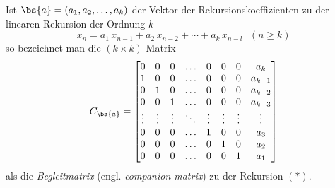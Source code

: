 
Ist $\bs{a} = (a_1,a_2,\ldots,a_k)$ der Vektor der Rekursionskoeffizienten zu
der linearen Rekursion der Ordnung $k$
\begin{equation*}
x_{n} = a_1 \, x_{n-1} + a_2 \, x_{n-2} + \cdots + a_k \, x_{n-l}~~~(n \geq k)
\tag{$*$}
\end{equation*}
so bezeichnet man die $(k \times k)$-Matrix
\[
C_{\bs{a}} = \begin{bmatrix}
0 & 0 & 0 &    \ldots & 0& 0& 0  & a_k \cr
1 & 0 & 0 &    \ldots & 0& 0& 0  & a_{k-1} \cr
0 & 1 & 0 &   \ldots & 0& 0& 0 & a_{k-2} \cr
0 & 0 & 1 &   \ldots & 0& 0& 0 & a_{k-3} \cr
\vdots & \vdots    & \vdots & \ddots & \vdots&  \vdots &\vdots & \vdots \cr
0 & 0 & 0 &  \ldots &1 & 0 & 0 & a_3 \cr
0 & 0 & 0 &    \ldots &0 & 1& 0 & a_2 \cr
0 & 0 & 0 &   \ldots &0 & 0& 1 & a_1
\end{bmatrix}
\]
als die \emph{Begleitmatrix} (engl. \emph{companion matrix}) zu der Rekursion $(*)$.

